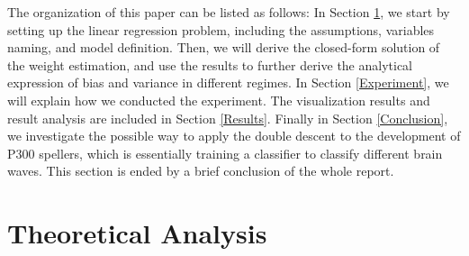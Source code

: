 \documentclass{article}
\begin{document}
\vspace{-3mm}
The organization of this paper can be listed as follows: In Section \ref{Theoretical}, we start by setting up the linear regression problem, including the assumptions, variables naming, and model definition. Then, we will derive the closed-form solution of the weight estimation, and use the results to further derive the analytical expression of bias and variance in different regimes. In Section \ref{Experiment}, we will explain how we conducted the experiment. The visualization results and result analysis are included in Section \ref{Results}. Finally in Section \ref{Conclusion}, we investigate the possible way to apply the double descent to the development of P300 spellers, which is essentially training a classifier to classify different brain waves. This section is ended by a brief conclusion of the whole report.


\section{Theoretical Analysis} \label{Theoretical}
\end{document}
